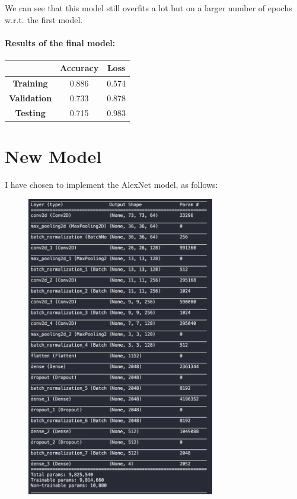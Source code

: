 \documentclass[a4paper]{article}
\begin{document}
We can see that this model still overfits a lot but on a larger number of epochs w.r.t. the first model.
\newpage
\paragraph{Results of the final model:}
\begin{center}
\begin{tabular}{|c|c|c|} 
 \hline
 & \textbf{Accuracy} & \textbf{Loss}\\ 
 \hline
 \textbf{Training} & 0.886 & 0.574 \\
 \textbf{Validation} & 0.733 & 0.878 \\
 \textbf{Testing} & 0.715 & 0.983 \\
 \hline
\end{tabular}
\end{center}
\section{New Model}
I have chosen to implement the AlexNet model, as follows:
\begin{figure} [h!]
\centering
\includegraphics[width=0.73\textwidth]{new_model.png}
\label{fig: new_model}
\end{figure}
\newpage
\end{document}
